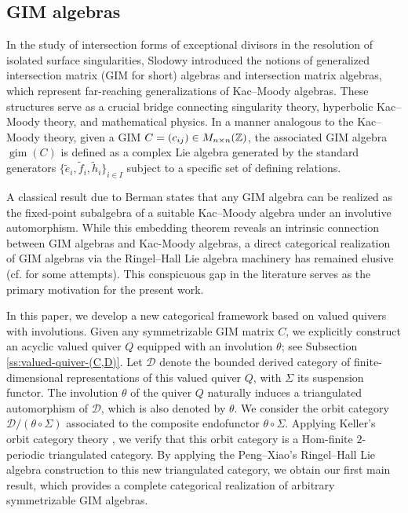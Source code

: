 \documentclass[12pt,reqno]{amsart}
\numberwithin{equation}{section}
\newcommand{\gim}{\operatorname{gim}\nolimits}
\def \Z{{\Bbb Z}}
\begin{document}
	\subsection{GIM  algebras}
	In the study of intersection forms of exceptional divisors in the resolution of isolated surface singularities, Slodowy \cite{S84-Beyond-Kac-Moody-alg-inside} introduced the notions of generalized intersection matrix (GIM for short) algebras and  intersection matrix algebras, which represent far-reaching generalizations of Kac--Moody algebras. These structures serve as a crucial bridge connecting singularity theory, hyperbolic Kac--Moody theory, and mathematical physics. In a manner analogous to the Kac--Moody theory, given a GIM $C=(c_{ij})\in M_{n\times n}(\Z)$, the associated GIM algebra $\gim(C)$ is defined as a complex Lie algebra generated by the standard generators $\{\tilde{e}_i, \tilde{f}_i, \tilde{h}_i\}_{i \in I}$ subject to a specific set of defining relations.
	
	
	A classical result due to Berman \cite{B89-GIM-alg} states that any GIM algebra can be realized as the fixed-point subalgebra of a suitable Kac--Moody algebra under an involutive automorphism. While this embedding theorem reveals an intrinsic connection between GIM algebras and Kac-Moody algebras, a direct categorical realization of GIM algebras via the Ringel--Hall Lie algebra machinery has remained elusive (cf. \cite{P02,Fu12} for some attempts). This conspicuous gap in the literature serves as the primary motivation for the present work. 
	
	In this paper, we develop a new categorical framework based on  valued quivers with involutions. 
	Given any symmetrizable GIM matrix $C$, we explicitly construct an acyclic valued quiver $Q$ equipped with an involution $\theta$; see Subsection \ref{ss:valued-quiver-(C,D)}. 
	Let $\mathcal{D}$ denote the bounded derived category of finite-dimensional representations of this valued quiver $Q$, with $\Sigma$ its suspension functor. The involution $\theta$ of the quiver $Q$ naturally induces a triangulated automorphism of $\mathcal{D}$, which is also denoted by $\theta$. 
	We consider the orbit category $\mathcal{D}/(\theta\circ \Sigma)$ associated to the composite endofunctor $\theta\circ\Sigma$. Applying Keller’s orbit category theory \cite{Ke05-tri-orb-cat}, we verify that this orbit category is a Hom-finite $2$-periodic triangulated category. By applying the Peng--Xiao's Ringel–Hall Lie algebra construction \cite{PX00-Tri-Cat-Kac} to this new triangulated category, we obtain our first main result, which provides a complete categorical realization of arbitrary symmetrizable GIM  algebras.
	
\end{document}
